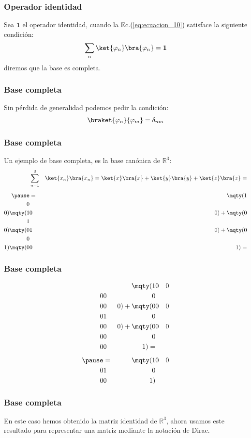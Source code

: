 \begin{frame}
\frametitle{Operador identidad}
Sea $\mathbf{1}$ el operador identidad, cuando la Ec.(\ref{eq:ecuacion_10}) satisface la siguiente condición:
\begin{align}
\sum_{n} \ket{\varphi_{n}} \bra{\varphi_{n}} = \mathbf{1}
\label{eq:ecuacion_11}
\end{align}
diremos que la base es completa.
\end{frame}
\begin{frame}
\frametitle{Base completa}
Sin pérdida de generalidad podemos pedir la condición:
\begin{align*}
\braket{\varphi_{n}}{\varphi_{m}} = \delta_{nm}
\end{align*}
\end{frame}
\begin{frame}
\frametitle{Base completa}
Un ejemplo de base completa, es la base canónica de $\mathbb{R}^{3}$:
\fontsize{12}{12}\selectfont
\begin{eqnarray*}
&\sum_{n=1}^{3}& \ket{x_{n}} \bra{x_{n}} = \ket{x} \bra{x} + \ket{y} \bra{y} + \ket{z} \bra{z} = \\[0.5em] \pause
&=& \! \! \! \! \mqty(1 \\ 0 \\ 0) \mqty(1 & 0 & 0) + \mqty(0 \\ 1 \\ 0) \mqty(0 & 1 & 0) + \mqty(0 \\ 0 \\ 1) \mqty(0 & 0 & 1) =
\end{eqnarray*}
\end{frame}
\begin{frame}
\frametitle{Base completa}
\fontsize{12}{12}\selectfont
\begin{eqnarray*}
&{}&\mqty(
1 & 0 & 0 \\
0 & 0 & 0 \\
0 & 0 & 0
) +
\mqty(
0 & 0 & 0 \\
0 & 1 & 0 \\
0 & 0 & 0
) + 
\mqty(
0 & 0 & 0 \\
0 & 0 & 0 \\
0 & 0 & 1
) = \\[0.5em] \pause
&=& \mqty(
1 & 0 & 0 \\
0 & 1 & 0 \\
0 & 0 & 1
)  
\end{eqnarray*}
\end{frame}
\begin{frame}
\frametitle{Base completa}
En este caso hemos obtenido la matriz identidad de $\mathbb{R}^{3}$, ahora usamos este resultado para representar una matriz mediante la notación de Dirac.
\end{frame}
